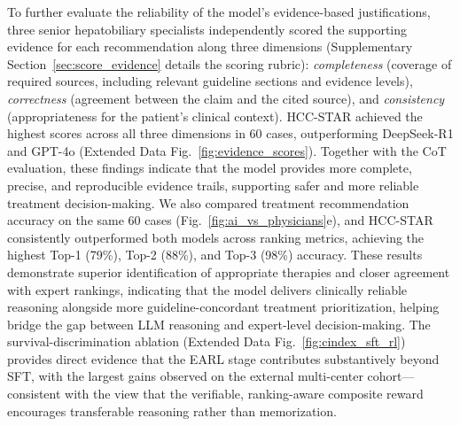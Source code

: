 \documentclass{article}
\begin{document}
To further evaluate the reliability of the model’s evidence-based justifications, three senior hepatobiliary specialists independently scored the supporting evidence for each recommendation along three dimensions (Supplementary Section~\ref{sec:score_evidence} details the scoring rubric): \emph{completeness} (coverage of required sources, including relevant guideline sections and evidence levels), \emph{correctness} (agreement between the claim and the cited source), and \emph{consistency} (appropriateness for the patient’s clinical context). {HCC-STAR} achieved the highest scores across all three dimensions in 60 cases, outperforming DeepSeek-R1 and GPT-4o (Extended Data Fig.~\ref{fig:evidence_scores}). Together with the CoT evaluation, these findings indicate that the model provides more complete, precise, and reproducible evidence trails, supporting safer and more reliable treatment decision-making. We also compared treatment recommendation accuracy on the same 60 cases (Fig.~\ref{fig:ai_vs_physicians}e), and {HCC-STAR} consistently outperformed both models across ranking metrics, achieving the highest Top-1 (79\%), Top-2 (88\%), and Top-3 (98\%) accuracy. These results demonstrate superior identification of appropriate therapies and closer agreement with expert rankings, indicating that the model delivers clinically reliable reasoning alongside more guideline-concordant treatment prioritization, helping bridge the gap between LLM reasoning and expert-level decision-making. The survival-discrimination ablation (Extended Data Fig.~\ref{fig:cindex_sft_rl}) provides direct evidence that the EARL stage contributes substantively beyond SFT, with the largest gains observed on the external multi-center cohort—consistent with the view that the verifiable, ranking-aware composite reward encourages transferable reasoning rather than memorization.
\end{document}
